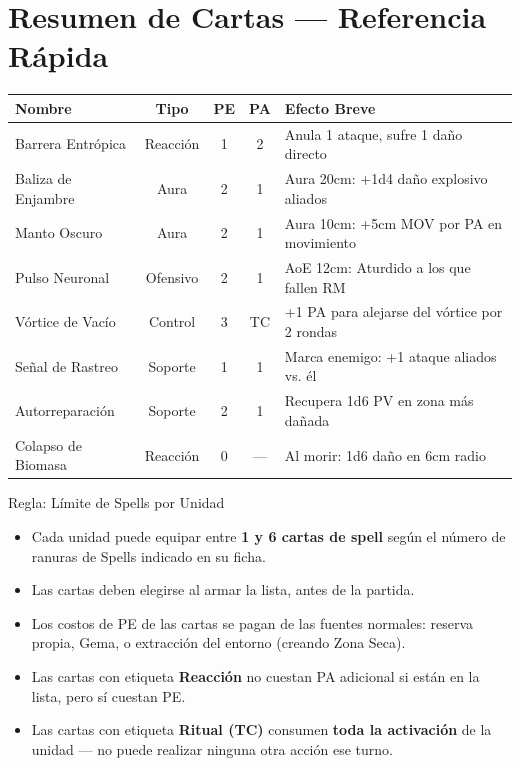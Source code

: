 \newpage
\section*{Resumen de Cartas — Referencia Rápida}

\begin{tabularx}{\linewidth}{|l|c|c|c|X|}
\hline
\rowcolor{VoidPurple!25} \textbf{Nombre} & \textbf{Tipo} & \textbf{PE} & \textbf{PA} & \textbf{Efecto Breve} \\ \hline
Barrera Entrópica & Reacción & 1 & 2 & Anula 1 ataque, sufre 1 daño directo \\ \hline
Baliza de Enjambre & Aura & 2 & 1 & Aura 20cm: +1d4 daño explosivo aliados \\ \hline
Manto Oscuro & Aura & 2 & 1 & Aura 10cm: +5cm MOV por PA en movimiento \\ \hline
Pulso Neuronal & Ofensivo & 2 & 1 & AoE 12cm: Aturdido a los que fallen RM \\ \hline
Vórtice de Vacío & Control & 3 & TC & +1 PA para alejarse del vórtice por 2 rondas \\ \hline
Señal de Rastreo & Soporte & 1 & 1 & Marca enemigo: +1 ataque aliados vs. él \\ \hline
Autorreparación & Soporte & 2 & 1 & Recupera 1d6 PV en zona más dañada \\ \hline
Colapso de Biomasa & Reacción & 0 & — & Al morir: 1d6 daño en 6cm radio \\ \hline
\end{tabularx}

\vspace{0.5cm}

\begin{reglabiskrida}{Regla: Límite de Spells por Unidad}
\begin{itemize}
    \item Cada unidad puede equipar entre \textbf{1 y 6 cartas de spell} según el número de ranuras de Spells indicado en su ficha.
    \item Las cartas deben elegirse al armar la lista, antes de la partida.
    \item Los costos de PE de las cartas se pagan de las fuentes normales: reserva propia, Gema, o extracción del entorno (creando Zona Seca).
    \item Las cartas con etiqueta \textbf{Reacción} no cuestan PA adicional si están en la lista, pero sí cuestan PE.
    \item Las cartas con etiqueta \textbf{Ritual (TC)} consumen \textbf{toda la activación} de la unidad — no puede realizar ninguna otra acción ese turno.
\end{itemize}
\end{reglabiskrida}

